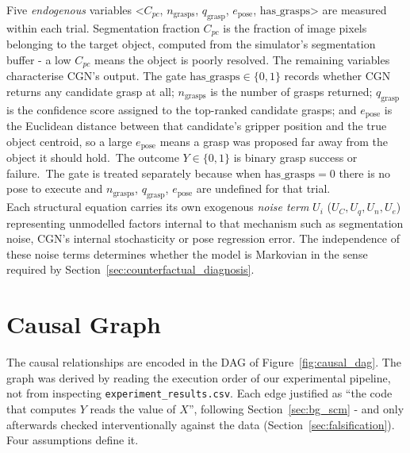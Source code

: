 \documentclass[11pt,a4paper]{report}
\begin{document}
\noindent Five \emph{endogenous} variables <$C_{pc}$, $n_{\text{grasps}}$, $q_{\text{grasp}}$, $e_{\text{pose}}$, $\text{has\_grasps}$> are measured within each trial. Segmentation fraction $C_{pc}$ is the fraction of image pixels belonging to the target object, computed from the simulator's segmentation buffer - a low $C_{pc}$ means the object is poorly resolved. The remaining variables characterise CGN's output. The gate $\text{has\_grasps} \in \{0,1\}$ records whether CGN returns any candidate grasp at all; $n_{\text{grasps}}$ is the number of grasps returned; $q_{\text{grasp}}$ is the confidence score assigned to the top-ranked candidate grasps; and $e_{\text{pose}}$ is the Euclidean distance between that candidate's gripper position and the true object centroid, so a large $e_{\text{pose}}$ means a grasp was proposed far away from the object it should hold.~The outcome $Y \in \{0,1\}$ is binary grasp success or failure.~The gate is treated separately because when $\text{has\_grasps}=0$ there is no pose to execute and $n_{\text{grasps}}$, $q_{\text{grasp}}$, $e_{\text{pose}}$ are undefined for that trial. \\

\noindent Each structural equation carries its own exogenous \emph{noise term} $U_i$ ($U_C, U_q, U_n, U_e$) representing unmodelled factors internal to that mechanism such as segmentation noise, CGN's internal stochasticity or pose regression error. The independence of these noise terms determines whether the model is Markovian in the sense required by Section~\ref{sec:counterfactual_diagnosis}.

\section{Causal Graph}
\label{sec:causal_graph}

The causal relationships are encoded in the DAG of Figure~\ref{fig:causal_dag}. The graph was derived by reading the execution order of our experimental pipeline, not from inspecting \texttt{experiment\_results.csv}. Each edge justified as ``the code that computes $Y$ reads the value of $X$'', following Section~\ref{sec:bg_scm} - and only afterwards checked interventionally against the data (Section~\ref{sec:falsification}). Four assumptions define it.
\end{document}
